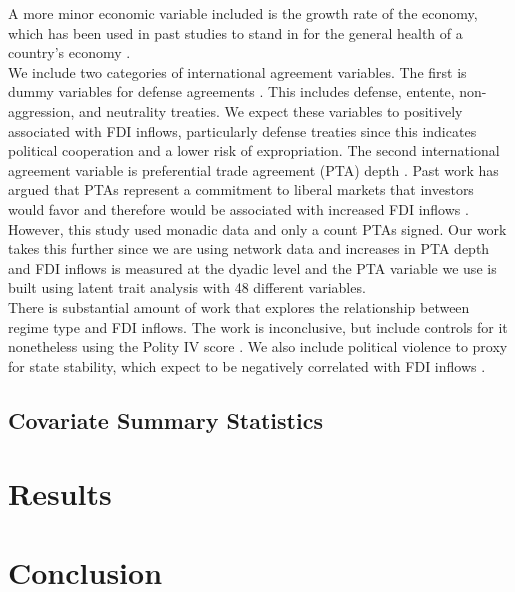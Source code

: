 \documentclass{article}
\begin{document}
A more minor economic variable included is the growth rate of the economy, which has been used in past studies to stand in for the general health of a country's economy \cite{WB2}.\\

We include two categories of international agreement variables. The first is dummy variables for defense agreements \cite{Gibler09}. This includes defense, entente, non-aggression, and neutrality treaties. We expect these variables to positively associated with FDI inflows, particularly defense treaties since this indicates political cooperation and a lower risk of expropriation. The second international agreement variable is preferential trade agreement (PTA) depth \cite{dur2014design}. Past work has argued that PTAs represent a commitment to liberal markets that investors would favor and therefore would be associated with increased FDI inflows \cite{BM14}. However, this study used monadic data and only a count PTAs signed. Our work takes this further since we are using network data and increases in PTA depth and FDI inflows is measured at the dyadic level and the PTA variable we use is built using latent trait analysis with 48 different variables.\\

There is substantial amount of work that explores the relationship between regime type and FDI inflows. The work is inconclusive, but include controls for it nonetheless using the Polity IV score \cite{polity2012polity}. We also include political violence to proxy for state stability, which expect to be negatively correlated with FDI inflows \cite{marshall2005major}.

\subsection{Covariate Summary Statistics}

\section{Results}

\section{Conclusion}


\newpage


\end{document}
